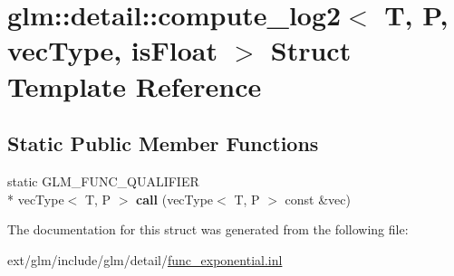 \hypertarget{structglm_1_1detail_1_1compute__log2}{\section{glm\-:\-:detail\-:\-:compute\-\_\-log2$<$ T, P, vec\-Type, is\-Float $>$ Struct Template Reference}
\label{structglm_1_1detail_1_1compute__log2}
}
\subsection*{Static Public Member Functions}
\begin{DoxyCompactItemize}
\item 
\hypertarget{structglm_1_1detail_1_1compute__log2_a5861f27c41f2fe68da0adf5634b54c6d}{static G\-L\-M\-\_\-\-F\-U\-N\-C\-\_\-\-Q\-U\-A\-L\-I\-F\-I\-E\-R \\*
vec\-Type$<$ T, P $>$ {\bfseries call} (vec\-Type$<$ T, P $>$ const \&vec)}\label{structglm_1_1detail_1_1compute__log2_a5861f27c41f2fe68da0adf5634b54c6d}

\end{DoxyCompactItemize}


The documentation for this struct was generated from the following file\-:\begin{DoxyCompactItemize}
\item 
ext/glm/include/glm/detail/\hyperlink{func__exponential_8inl}{func\-\_\-exponential.\-inl}\end{DoxyCompactItemize}
